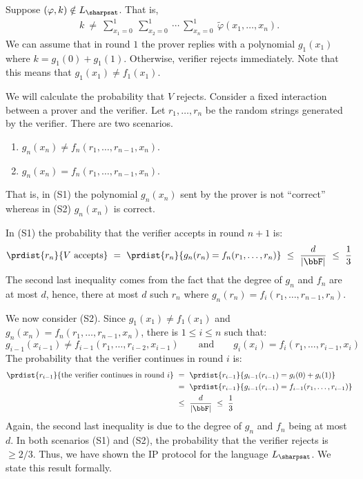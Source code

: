 \documentclass[11pt, a4paper]{article}
\begin{document}
Suppose $(\varphi,k)\notin L_{\sharpsat}$.
That is,
\begin{align*}
k \ \neq \
\sum_{x_1=0}^1\ \sum_{x_2=0}^1\ \cdots\ \sum_{x_n=0}^1 \ \widetilde{\varphi}(x_1,\ldots,x_n).
\end{align*}
We can assume that in round $1$ the prover replies with a polynomial $g_1(x_1)$ where $k=g_1(0)+g_1(1)$.
Otherwise, verifier rejects immediately.
Note that this means that $g_1(x_1)\neq f_1(x_1)$.

We will calculate the probability that $V$ rejects.
Consider a fixed interaction between a prover and the verifier.
Let $r_1,\ldots,r_n$ be the random strings generated by the verifier.
There are two scenarios.
\begin{enumerate}[(S1)]
\item
$g_n(x_n) \neq f_n(r_1,\ldots,r_{n-1},x_n)$.
\item 
$g_n(x_n) = f_n(r_1,\ldots,r_{n-1},x_n)$.
\end{enumerate}
That is, in (S1) the polynomial $g_n(x_n)$ sent by the prover is not ``correct''
whereas in (S2) $g_n(x_n)$ is correct.

In (S1) the probability that the verifier accepts in round $n+1$ is:
$$
\prdist {r_n} {V \ \text{accepts}}\ =\ \prdist {r_n} {g_n(r_n)=f_n(r_1,\ldots,r_n)}\ \leq\ \frac{d}{|\bbF|}\ \leq\ \frac{1}{3}
$$
The second last inequality comes from the fact that the degree of $g_n$ and $f_n$ are at most $d$,
hence, there at most $d$ such $r_n$ where $g_n(r_n)= f_i(r_1,\ldots,r_{n-1},r_n)$.

We now consider (S2).
Since $g_1(x_1)\neq f_1(x_1)$ and $g_n(x_n) = f_n(r_1,\ldots,r_{n-1},x_n)$,
there is $1\leq i \leq n$ such that:
$$
g_{i-1}(x_{i-1})\neq  f_{i-1}(r_1,\ldots,r_{i-2},x_{i-1})
\qquad\text{and}\qquad
g_i(x_i) = f_i(r_1,\ldots,r_{i-1},x_i)
$$
The probability that the verifier continues in round $i$ is:
\begin{align*}
\prdist {r_{i-1}} { \text{the verifier continues in round} \ i }
&\ = \
\prdist {r_{i-1}} { g_{i-1}(r_{i-1})= g_{i}(0)+g_{i}(1) }
\\
&\ = \  \prdist {r_{i-1}} { g_{i-1}(r_{i-1})= f_{i-1}(r_1,\ldots,r_{i-1}) }
\\
&\ \leq \ \frac{d}{|\bbF|}\ \leq\ \frac{1}{3} 
\end{align*}
Again, the second last inequality is due to the degree of $g_n$ and $f_n$ being at most $d$.
In both scenarios (S1) and (S2), the probability that the verifier rejects is $\geq 2/3$.
Thus, we have shown the IP protocol for the language $L_{\sharpsat}$.
We state this result formally.
\end{document}
